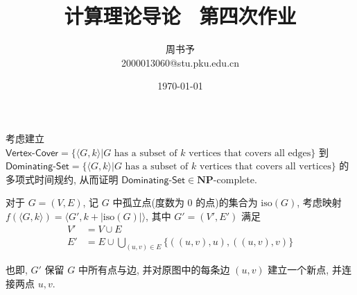 \documentclass[8pt]{article}
\title{\heiti\zihao{1} 计算理论导论 \ 第四次作业}
\author{\kaishu\zihao{-3} 周书予\\2000013060@stu.pku.edu.cn}
\date{\today}
\theoremstyle{compact}
\begin{document}
\pagestyle{plain}



\maketitle

\section{}


考虑建立 $\textsf{Vertex-Cover} = \{\langle G, k \rangle | G \text { has a subset of } k \text{ vertices that covers all 	edges}\}$ 到 $\textsf{Dominating-Set} = \{\langle G, k \rangle | G \text { has a subset of } k \text{ vertices that covers all 	vertices}\}$ 的多项式时间规约, 从而证明 $\textsf{Dominating-Set} \in \mathbf{NP}$-complete.

对于 $G = (V, E)$, 记 $G$ 中孤立点(度数为 $0$ 的点)的集合为 $\text{iso}(G)$, 考虑映射 $f(\langle G, k \rangle) = \langle G', k + |\text{iso}(G)| \rangle$, 其中 $G' = (V', E')$ 满足 \begin{equation*}
	\begin{split}
		V' &= V \cup E \\
		E' &= E \cup \bigcup_{(u, v) \in E}\{((u, v), u), ((u, v), v)\}
	\end{split}
\end{equation*}

也即, $G'$ 保留 $G$ 中所有点与边, 并对原图中的每条边 $(u, v)$ 建立一个新点, 并连接两点 $u, v$.
\end{document}
